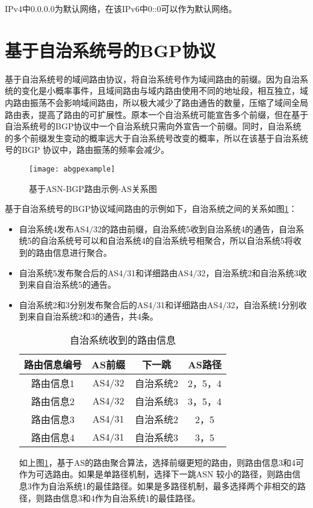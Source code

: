 IPv4中0.0.0.0为默认网络，在该IPv6中0::0可以作为默认网络。

\section{基于自治系统号的BGP协议}

基于自治系统号的域间路由协议，将自治系统号作为域间路由的前缀。因为自治系统的变化是小概率事件，且域间路由与域内路由使用不同的地址段，相互独立，域内路由振荡不会影响域间路由，所以极大减少了路由通告的数量，压缩了域间全局路由表，提高了路由的可扩展性。原本一个自治系统可能宣告多个前缀，但在基于自治系统号的BGP协议中一个自治系统只需向外宣告一个前缀。同时，自治系统的多个前缀发生变动的概率远大于自治系统号改变的概率，所以在该基于自治系统号的BGP 协议中，路由振荡的频率会减少。

\begin{figure}
  \centering
  \texttt{[image: abgpexample]}
  \caption{基于ASN-BGP路由示例-AS关系图}
  \label{fig:abgpexample}
\end{figure}


基于自治系统号的BGP协议域间路由的示例如下，自治系统之间的关系如图\ref{fig:abgpexample}：

\begin{itemize}
\item 自治系统4发布AS4$/$32的路由前缀，自治系统5收到自治系统4的通告，自治系统5的自治系统号可以和自治系统4的自治系统号相聚合，所以自治系统5将收到的路由信息进行聚合。
\item 自治系统5发布聚合后的AS4$/$31和详细路由AS4$/$32，自治系统2和自治系统3收到来自自治系统5的通告。
\item 自治系统2和3分别发布聚合后的AS4$/$31和详细路由AS4$/$32，自治系统1分别收到来自自治系统2和3的通告，共4条。

\begin{table}[h]
    \centering
    \caption{自治系统收到的路由信息}
    \label{tab:oneroutinginfo}
        \begin{tabular}{|c|c|c|c|}
        \hline
            路由信息编号 & AS前缀 & 下一跳 & AS路径\\ \hline
            路由信息1 & AS4$/$32 & 自治系统2 & 2，5，4\\ \hline
            路由信息2 & AS4$/$32 & 自治系统3 & 3，5，4\\ \hline
            路由信息3 & AS4$/$31 & 自治系统2 & 2，5\\ \hline
            路由信息4 & AS4$/$31 & 自治系统3 & 3，5\\
        \hline
        \end{tabular}
\end{table}
    如上图\ref{tab:oneroutinginfo}，基于AS的路由聚合算法，选择前缀更短的路由，则路由信息3和4可作为可选路由。如果是单路径机制，选择下一跳ASN 较小的路径，则路由信息3作为自治系统1的最佳路径。如果是多路径机制，最多选择两个非相交的路径，则路由信息3和4作为自治系统1的最佳路径。

\end{itemize}



